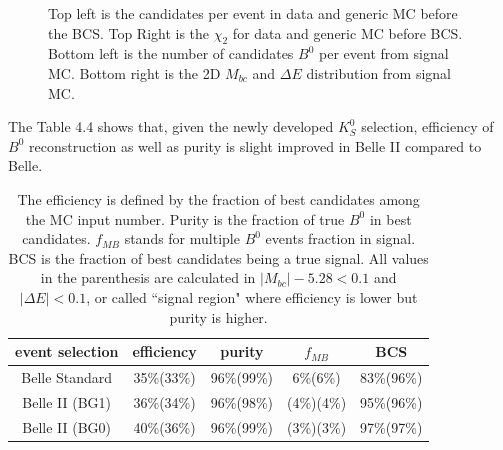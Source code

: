 \begin{figure}[H]
\begin{minipage}[b]{0.5\linewidth}
	\end{minipage}
	
	\caption{Top left is the candidates per event in data and generic MC before the BCS. Top Right is the $\chi_2$ for data and generic MC before BCS. Bottom left is the number of candidates $B^0$ per event from signal MC. Bottom right is the 2D $M_{bc}$ and $\Delta E$ distribution from signal MC.}
\end{figure}
The Table 4.4 shows that, given the newly developed $K_S^0$ selection, efficiency of $B^0$ reconstruction as well as purity is slight improved in Belle II compared to Belle.
\begin{table}[H]
	\centering
	\begin{tabular}{c|c|c|c|c}
		\hline
		event selection & efficiency & purity  & $f_{MB}$  & BCS \\
		\hline
		\hline
		Belle Standard & 35\%(33\%) & 96\%(99\%) & 6\%(6\%) & 83\%(96\%)\\
		\hline 
		Belle II (BG1) & 36\%(34\%) & 96\%(98\%) & (4\%)(4\%) & 95\%(96\%)\\
		\hline
		Belle II (BG0) & 40\%(36\%) & 96\%(99\%) & (3\%)(3\%) & 97\%(97\%)\\
		\hline
	\end{tabular}
	\caption{The efficiency is defined by the fraction of best candidates among the MC input number. Purity is the fraction of true $B^0$ in best candidates. $f_{MB}$ stands for multiple $B^0$ events fraction in signal. BCS is the fraction of best candidates being a true signal. All values in the parenthesis are calculated in $| M_{bc} |- 5.28 < 0.1$ and $|\Delta E| < 0.1$, or called ``signal region" where efficiency is lower but purity is higher. }
\end{table}
